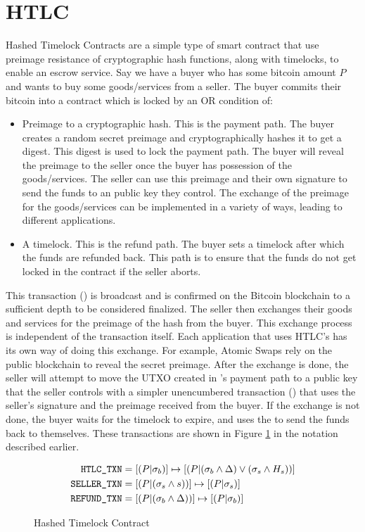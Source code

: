 \section{HTLC}
Hashed Timelock Contracts are a simple type of smart contract that use preimage resistance of cryptographic hash functions, along with timelocks, to enable an escrow service. Say we have a buyer who has some bitcoin amount $P$ and wants to buy some goods/services from a seller. The buyer commits their bitcoin into a contract which is locked by an OR condition of:
\begin{itemize}
    \item Preimage to a cryptographic hash. This is the payment path. The buyer creates a random secret preimage and cryptographically hashes it to get a digest. This digest is used to lock the payment path. The buyer will reveal the preimage to the seller once the buyer has possession of the goods/services. The seller can use this preimage and their own signature to send the funds to an public key they control. The exchange of the preimage for the goods/services can be implemented in a variety of ways, leading to different applications.
    \item A timelock. This is the refund path. The buyer sets a timelock after which the funds are refunded back. This path is to ensure that the funds do not get locked in the contract if the seller aborts. 
\end{itemize}

This transaction (\htlctxn{}) is broadcast and is confirmed on the Bitcoin blockchain to a sufficient depth to be considered finalized. The seller then exchanges their goods and services for the preimage of the hash from the buyer. This exchange process is independent of the transaction itself. Each application that uses HTLC's has its own way of doing this exchange. For example, Atomic Swaps rely on the public blockchain to reveal the secret preimage. After the exchange is done, the seller will attempt to move the UTXO created in \htlctxn{}'s payment path to a public key that the seller controls with a simpler unencumbered transaction (\sellertxn{}) that uses the seller's signature and the preimage received from the buyer. If the exchange is not done, the buyer waits for the timelock to expire, and uses the  to send the funds back to themselves. These transactions are shown in Figure \ref{fig:htlc_txn} in the notation described earlier.

\begin{figure}[!htb!]
    \centering
    \caption{Hashed Timelock Contract}
    \label{fig:htlc_txn}
\begin{align*}
    \texttt{HTLC\_TXN}{} &= [(P|\sigma_b)] \mapsto [(P|(\sigma_b \land \Delta) \lor (\sigma_s \land H_{s}))] \\
    \texttt{SELLER\_TXN}{} &= [(P|(\sigma_s \land s))] \mapsto [(P|\sigma_s)] \\
    \texttt{REFUND\_TXN}{} &= [(P|(\sigma_b\land \Delta))] \mapsto [(P|\sigma_b)]
\end{align*}
\end{figure}


